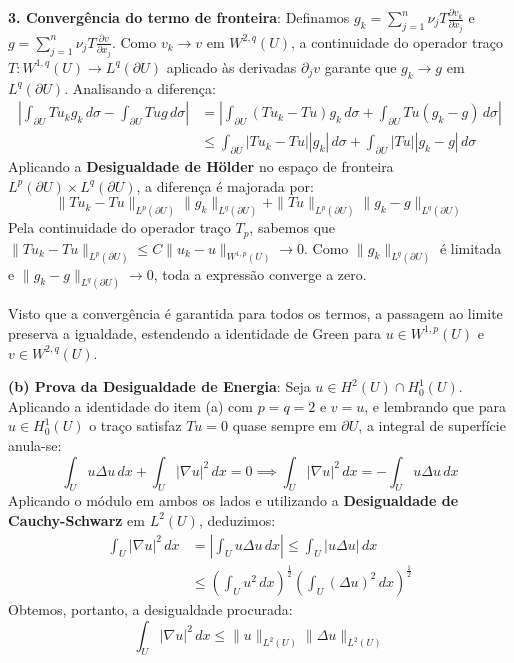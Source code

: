 \documentclass[cs_edp_2026.1.tex]{subfiles} %
\begin{document}
{	\textbf{3. Convergência do termo de fronteira}:
	Definamos $g_k = \sum_{j=1}^n \nu_j T \frac{\partial v_k}{\partial x_j}$ e $g = \sum_{j=1}^n \nu_j T \frac{\partial v}{\partial x_j}$. Como $v_k \to v$ em $W^{2,q}(U)$, a continuidade do operador traço $T: W^{1,q}(U) \to L^q(\partial U)$ aplicado às derivadas $\partial_j v$ garante que $g_k \to g$ em $L^q(\partial U)$. Analisando a diferença:
	\begin{align*}
		\left| \int_{\partial U} T u_k g_k \, d\sigma - \int_{\partial U} T u g \, d\sigma \right| &= \left| \int_{\partial U} (T u_k - T u) g_k \, d\sigma + \int_{\partial U} T u (g_k - g) \, d\sigma \right| \\
		&\le \int_{\partial U} |T u_k - T u| |g_k| \, d\sigma + \int_{\partial U} |T u| |g_k - g| \, d\sigma
	\end{align*}
	Aplicando a \textbf{Desigualdade de Hölder} no espaço de fronteira $L^p(\partial U) \times L^q(\partial U)$, a diferença é majorada por:
	$$ \|T u_k - T u\|_{L^p(\partial U)} \|g_k\|_{L^q(\partial U)} + \|T u\|_{L^p(\partial U)} \|g_k - g\|_{L^q(\partial U)} $$
	Pela continuidade do operador traço $T_p$, sabemos que $\|T u_k - T u\|_{L^p(\partial U)} \le C \|u_k - u\|_{W^{1,p}(U)} \to 0$. Como $\|g_k\|_{L^q(\partial U)}$ é limitada e $\|g_k - g\|_{L^q(\partial U)} \to 0$, toda a expressão converge a zero.
	
	Visto que a convergência é garantida para todos os termos, a passagem ao limite preserva a igualdade, estendendo a identidade de Green para $u \in W^{1,p}(U)$ e $v \in W^{2,q}(U)$.
	
	\textbf{(b) Prova da Desigualdade de Energia}:
	Seja $u \in H^2(U) \cap H_0^1(U)$. Aplicando a identidade do item (a) com $p=q=2$ e $v=u$, e lembrando que para $u \in H_0^1(U)$ o traço satisfaz $T u = 0$ quase sempre em $\partial U$, a integral de superfície anula-se:
	$$\int_U u \Delta u \, dx + \int_U |\nabla u|^2 \, dx = 0 \implies \int_U |\nabla u|^2 \, dx = - \int_U u \Delta u \, dx$$
	Aplicando o módulo em ambos os lados e utilizando a \textbf{Desigualdade de Cauchy-Schwarz} em $L^2(U)$, deduzimos:
	\begin{align*}
		\int_U |\nabla u|^2 \, dx &= \left| \int_U u \Delta u \, dx \right| \le \int_U |u \Delta u| \, dx \\
		&\le \left( \int_U u^2 \, dx \right)^{\frac{1}{2}} \left( \int_U (\Delta u)^2 \, dx \right)^{\frac{1}{2}}
	\end{align*}
	Obtemos, portanto, a desigualdade procurada:
	$$\boxed{\int_U |\nabla u|^2 \, dx \le \|u\|_{L^2(U)} \|\Delta u\|_{L^2(U)}}$$
}
\end{document}
